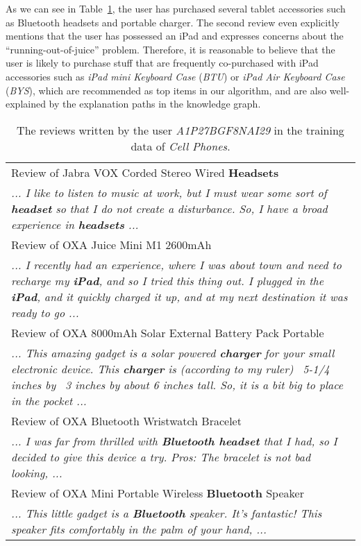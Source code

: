 \documentclass[algorithms,article,accept,moreauthors,pdftex,10pt,a4paper]{Definitions/mdpi}
\begin{document}
As we can see in Table~\ref{tab:user_review}, the user has purchased several tablet accessories such as Bluetooth headsets and portable charger.  
The second review even explicitly mentions that the user has possessed an iPad and expresses concerns about the ``running-out-of-juice'' problem.
Therefore, it is reasonable to believe that the user is likely to purchase stuff that are frequently co-purchased with iPad accessories such as \textit{iPad mini Keyboard Case} (\textit{BTU}) or \textit{iPad Air Keyboard Case} (\textit{BYS}), which are recommended as top items in our algorithm, and are also well-explained by the explanation paths in the knowledge graph.


\begin{table}[H]
	\centering
	\caption{The reviews written by the user \textit{A1P27BGF8NAI29} in the training data of \textit{Cell Phones}.}
	\begin{tabular}{p{15cm}}
\toprule
		Review of Jabra VOX Corded Stereo Wired \textbf{Headsets} \\ 
\textit{... I like to listen to music at work, but I must wear some sort of \textbf{headset} so that I do not create a disturbance. So, I have a broad experience in \textbf{headsets} ...}\\ 
\midrule
		Review of OXA Juice Mini M1 2600mAh \\
\textit{... I recently had an experience, where I was about town and need to recharge my \textbf{iPad}, and so I tried this thing out. I plugged in the \textbf{iPad}, and it quickly charged it up, and at my next destination it was ready to go ...}\\ \hline
Review of OXA 8000mAh Solar External Battery Pack Portable\\ 
\textit{... This amazing gadget is a solar powered \textbf{charger} for your small electronic device. This \textbf{charger} is (according to my ruler) ~5-1/4 inches by ~3 inches by about 6 inches tall. So, it is a bit big to place in the pocket ...}\\\hline 
Review of OXA Bluetooth Wristwatch Bracelet \\ 
\textit{... I was far from thrilled with \textbf{Bluetooth headset} that I had, so I decided to give this device a try. Pros: The bracelet is not bad looking, ...}\\ 
Review of OXA Mini Portable Wireless \textbf{Bluetooth} Speaker \\ 
\textit{... This little gadget is a \textbf{Bluetooth} speaker. It's fantastic! This speaker fits comfortably in the palm of your hand, ...}\\ 
\bottomrule
	\end{tabular}
	\label{tab:user_review}
\end{table}
\end{document}
